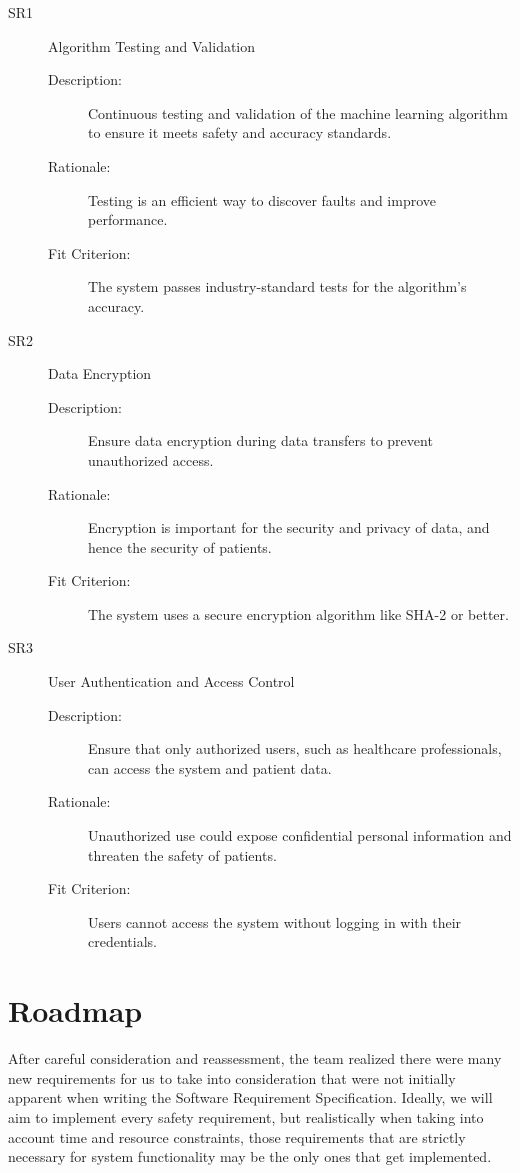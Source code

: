 \documentclass{article}
\begin{document}
\begin{description}
    \item[SR1] Algorithm Testing and Validation
    \begin{description}
        \item[Description:] Continuous testing and validation of the machine learning algorithm to ensure it meets safety and accuracy standards. 
        \item[Rationale:] Testing is an efficient way to discover faults and improve performance.
        \item[Fit Criterion:] The system passes industry-standard tests for the algorithm's accuracy.
    \end{description}
\end{description}

\begin{description}
    \item[SR2] Data Encryption
    \begin{description}
        \item[Description:] Ensure data encryption during data transfers to prevent unauthorized access.
        \item[Rationale:] Encryption is important for the security and privacy of data, and hence the security of patients. 
        \item[Fit Criterion:] The system uses a secure encryption algorithm like SHA-2 or better. 
    \end{description}
\end{description}

\begin{description}
    \item[SR3] User Authentication and Access Control
    \begin{description}
        \item[Description:] Ensure that only authorized users, such as healthcare professionals, can access the system and patient data.
        \item[Rationale:] Unauthorized use could expose confidential personal information and threaten the safety of patients.
        \item[Fit Criterion:] Users cannot access the system without logging in with their credentials.
    \end{description}
\end{description}


\section{Roadmap}
After careful consideration and reassessment, the team realized there were many new requirements for us to take into consideration that were not initially apparent when writing the Software Requirement Specification. Ideally, we will aim to implement every safety requirement, but realistically when taking into account time and resource constraints, those requirements that are strictly necessary for system functionality may be the only ones that get implemented.
\end{document}
